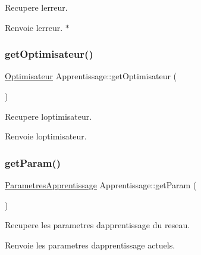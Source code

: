 Recupere l\textquotesingle{}erreur. 

\begin{DoxyReturn}{Renvoie}
l\textquotesingle{}erreur. $\ast$ 
\end{DoxyReturn}
\mbox{\label{class_apprentissage_af3fdf7d92ebf36d3edb6c4d06addc8e6}} 
\subsubsection{\texorpdfstring{get\+Optimisateur()}{getOptimisateur()}}
{\footnotesize\ttfamily \hyperlink{class_optimisateur}{Optimisateur} Apprentissage\+::get\+Optimisateur (\begin{DoxyParamCaption}{ }\end{DoxyParamCaption})}



Recupere l\textquotesingle{}optimisateur. 

\begin{DoxyReturn}{Renvoie}
l\textquotesingle{}optimisateur.\textquotesingle{} 
\end{DoxyReturn}
\mbox{\label{class_apprentissage_a025d66e8c5edb1c4c6ce9f3d8c983395}} 
\subsubsection{\texorpdfstring{get\+Param()}{getParam()}}
{\footnotesize\ttfamily \hyperlink{class_parametres_apprentissage}{Parametres\+Apprentissage} Apprentissage\+::get\+Param (\begin{DoxyParamCaption}{ }\end{DoxyParamCaption})}



Recupere les parametres d\textquotesingle{}apprentissage du reseau. 

\begin{DoxyReturn}{Renvoie}
les parametres d\textquotesingle{}apprentissage actuels. 
\end{DoxyReturn}
\mbox{\label{class_apprentissage_a56d2b6eff05342d1482bfed2a947b60d}} 
